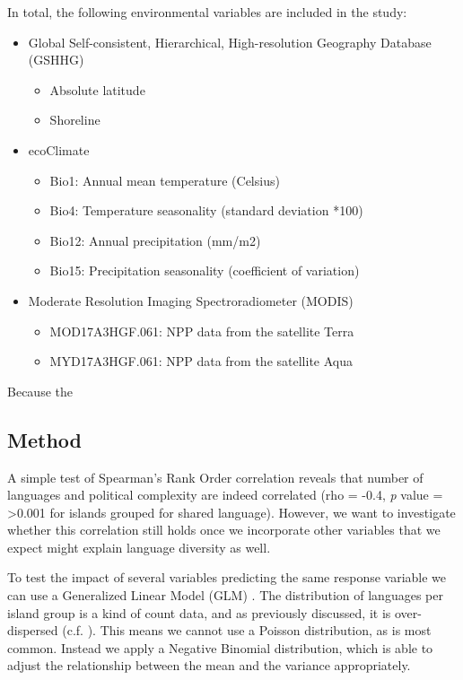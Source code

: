 \documentclass[a4paper,10pt]{article} %
\begin{document}
In total, the following environmental variables are included in the study:

\begin{itemize}
\item Global Self-consistent, Hierarchical, High-resolution Geography Database (GSHHG)
\begin{itemize}
    \item Absolute latitude
    \item Shoreline
\end{itemize}
\item ecoClimate
\begin{itemize}
\item Bio1: Annual mean temperature (Celsius)
\item Bio4: Temperature seasonality (standard deviation *100)
\item Bio12: Annual precipitation (mm/m2)
\item Bio15: Precipitation seasonality (coefficient of variation)
\end{itemize}
\item Moderate Resolution Imaging Spectroradiometer (MODIS)
\begin{itemize}
    \item MOD17A3HGF.061: NPP data from the satellite Terra
    \item MYD17A3HGF.061: NPP data from the satellite Aqua
\end{itemize}
\end{itemize}

Because the 





\subsection{Method}
\label{pol_complex_method}
A simple test of Spearman's Rank Order correlation reveals that number of languages and political complexity are indeed correlated (rho  = -0.4, \emph{p} value = >0.001 for islands grouped for shared language). However, we want to investigate whether this correlation still holds once we incorporate other variables that we expect might explain language diversity as well.

To test the impact of several variables predicting the same response variable we can use a Generalized Linear Model (GLM) \citep{venables2002modern}. The distribution of languages per island group is a kind of count data, and as previously discussed, it is over-dispersed (c.f. \citet[4-5]{gavin2012island}). This means we cannot use a Poisson distribution, as is most common. Instead we apply a Negative Binomial distribution, which is able to adjust the relationship between the mean and the variance appropriately. 
\end{document}
